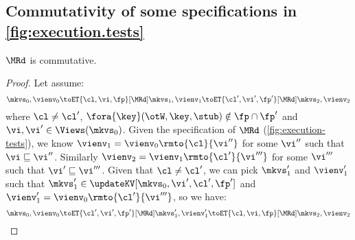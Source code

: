 \subsection{Commutativity of some specifications in \cref{fig:execution.tests}}
\begin{lemma}
    \label{lem:mr-comm}
    \(\MRd\) is commutative.
\end{lemma}
\begin{proof}
    Let assume:
    \[
        \mkvs_0, \vienv_0 \toET{\cl, \vi, \fp}[\MRd] \mkvs_1, \vienv_1 \toET{\cl', \vi', \fp'}[\MRd] \mkvs_2, \vienv_2 
    \]
    where \( \cl \neq \cl' \), \( \fora{ \key } (\otW, \key, \stub) \notin \fp \cap \fp' \) and \( \vi, \vi' \in \Views(\mkvs_0)\).
    Given the specification of \(\MRd\) (\cref{fig:execution-tests}), we know \( \vienv_1 = \vienv_0\rmto{\cl}{\vi''}\) for some \( \vi'' \) such that \( \vi \sqsubseteq \vi'' \).
    Similarly \( \vienv_2 = \vienv_1\rmto{\cl'}{\vi'''} \) for some \( \vi''' \) such that \(  \vi' \sqsubseteq \vi''' \). 
    Given that \( \cl \neq \cl' \), we can pick \( \mkvs'_1 \) and \( \vienv'_1 \) such that \( \mkvs'_1 \in \updateKV[\mkvs_0,\vi',\cl',\fp'] \) and \( \vienv'_1 = \vienv_0\rmto{\cl'}{\vi'''} \), so we have:
    \[
        \mkvs_0, \vienv_0 \toET{\cl', \vi', \fp'}[\MRd] \mkvs'_1, \vienv'_1 \toET{\cl, \vi, \fp}[\MRd] \mkvs_2, \vienv_2 
    \]
\end{proof}                                                                                    

